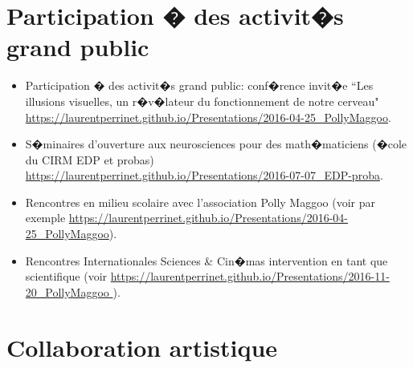 \section{Participation � des activit�s grand public} %

\begin{itemize}

%
%



	\item Participation � des activit�s grand public: conf�rence invit�e ``Les illusions visuelles, un r�v�lateur du fonctionnement de notre cerveau" \url{https://laurentperrinet.github.io/Presentations/2016-04-25_PollyMaggoo}.

	\item S�minaires d'ouverture aux neurosciences pour des math�maticiens  (�cole du CIRM EDP et probas)  \url{https://laurentperrinet.github.io/Presentations/2016-07-07_EDP-proba}.

	\item Rencontres  en milieu scolaire avec l'association Polly Maggoo  (voir par exemple \url{https://laurentperrinet.github.io/Presentations/2016-04-25_PollyMaggoo}).

	\item Rencontres Internationales Sciences \& Cin�mas intervention en tant que scientifique (voir \url{https://laurentperrinet.github.io/Presentations/2016-11-20_PollyMaggoo }).

\end{itemize}



\section{Collaboration artistique} %

